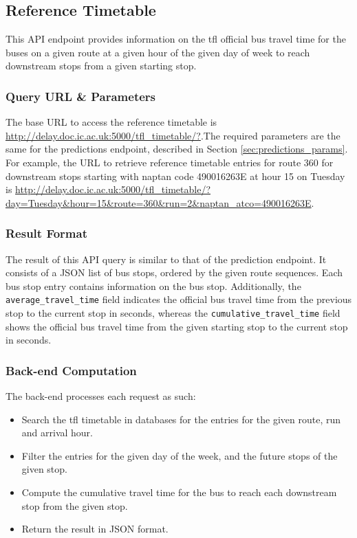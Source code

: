 
\subsection{Reference Timetable}
\par This API endpoint provides information on the \acrshort{tfl} official bus travel time for the buses on a given route at a given hour of the given day of week to reach downstream stops from a given starting stop.

\subsubsection{Query URL \& Parameters}
\par The base URL to access the reference timetable is \url{http://delay.doc.ic.ac.uk:5000/tfl_timetable/?}.The required parameters are the same for the predictions endpoint, described in Section \ref{sec:predictions_params}. For example, the URL to retrieve reference timetable entries for route 360 for downstream stops starting with \gls{naptan} code 490016263E at hour 15 on Tuesday is \url{http://delay.doc.ic.ac.uk:5000/tfl_timetable/?day=Tuesday&hour=15&route=360&run=2&naptan_atco=490016263E}.

\subsubsection{Result Format}
\par The result of this API query is similar to that of the prediction endpoint. It consists of a JSON list of bus stops, ordered by the given route sequences. Each bus stop entry contains information on the bus stop. Additionally, the \texttt{average\_travel\_time} field indicates the official bus travel time from the previous stop to the current stop in seconds, whereas the \texttt{cumulative\_travel\_time} field shows the official bus travel time from the given starting stop to the current stop in seconds.

\subsubsection{Back-end Computation}
The back-end processes each request as such:

\begin{itemize}
  \item Search the \acrshort{tfl} timetable in databases for the entries for the given route, run and arrival hour.
  \item Filter the entries for the given day of the week, and the future stops of the given stop.
  \item Compute the cumulative travel time for the bus to reach each downstream stop from the given stop.
  \item Return the result in JSON format.
\end{itemize}


